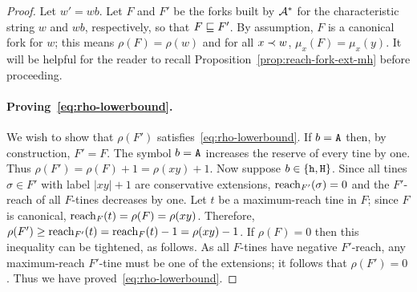 \begin{proof}  
  Let $w' = wb$.
  Let $F$ and $F'$ be the forks built by $\mathcal{A}^*$ 
  for the characteristic string $w$ and $wb$, respectively, 
  so that $F \sqsubseteq F'$.
  By assumption, $F$ is a canonical fork for $w$; 
  this means $\rho(F) = \rho(w)$ and
  for all $x \prec w$, $\mu_x(F) = \mu_x(y)$. 
  It will be helpful for the reader to recall Proposition~\ref{prop:reach-fork-ext-mh} before proceeding.


  \paragraph{Proving~\eqref{eq:rho-lowerbound}.} 
  We wish to show that 
  $\rho(F')$ satisfies~\eqref{eq:rho-lowerbound}. 
  If $b = \mathtt{A}$ then, by construction,
  $F' = F$. 
  The symbol $b = \mathtt{A}$ increases the reserve 
  of every tine by one. 
  Thus  
  $
  \rho(F') 
  = \rho(F) + 1
  = \rho(xy)  + 1
  $. 
  Now suppose $b \in \{\mathtt{h}, \mathtt{H}\}$. 
  Since all tines $\sigma \in F'$ with label $|xy| + 1$ 
  are conservative extensions, $\operatorname{reach}_{F'}(\sigma) = 0$ 
  and the $F'$-reach of all $F$-tines decreases by one. 
  Let $t$ be a maximum-reach tine in $F$; 
  since $F$ is canonical, $\operatorname{reach}_F(t) = \rho(F) = \rho(xy)$.
  Therefore, 
  $\rho(F') \geq \operatorname{reach}_{F'}(t) = \operatorname{reach}_{F}(t) - 1 = \rho(xy) - 1$. 
  If $\rho(F) = 0$ then this inequality can be tightened, as follows. 
  As all $F$-tines have negative $F'$-reach, 
  any maximum-reach $F'$-tine 
  must be one of the extensions; 
  it follows that $\rho(F') = 0$. 
  Thus we have proved~\eqref{eq:rho-lowerbound}. 




\end{proof}

